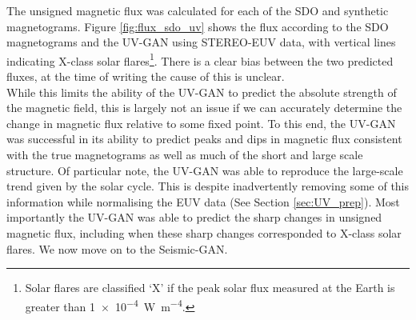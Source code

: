 \documentclass[11pt,a4paper,onecolumn]{report}
\begin{document}
The unsigned magnetic flux was calculated for each of the SDO and synthetic
magnetograms. Figure \ref{fig:flux_sdo_uv} shows the flux according to the SDO
magnetograms and the UV-GAN using STEREO-EUV data, with vertical lines
indicating X-class solar flares\footnote{Solar flares are classified `X' if the
peak solar flux measured at the Earth is greater than \SI{1e-4}{W.m^{-4}}.}.
There is a clear bias between the two predicted fluxes, at
the time of writing the cause of this is unclear.\\

While this limits the ability of the UV-GAN to predict the absolute strength of
the magnetic field, this is largely not an issue if we can accurately determine
the change in magnetic flux relative to some fixed point.
To this end, the UV-GAN was successful in its ability to predict peaks and dips
in magnetic flux consistent with the true magnetograms as well as much of the
short and large scale structure. Of particular note, the UV-GAN was able to
reproduce the large-scale trend given by the solar cycle. This is despite
inadvertently removing some of this information while normalising the EUV data
(See Section \ref{sec:UV_prep}). Most importantly the UV-GAN was able to predict
the sharp changes in unsigned magnetic flux, including when these sharp changes
corresponded to X-class solar flares. We now move on to the Seismic-GAN. 
\end{document}
